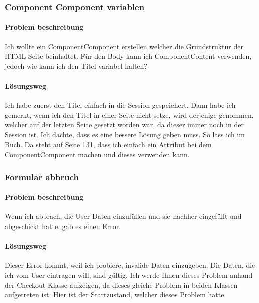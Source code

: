 \documentclass[a4paper, 11pt]{article}
\begin{document}
\subsubsection{Component Component variablen}

\paragraph{Problem beschreibung}

Ich wollte ein ComponentComponent erstellen welcher die Grundstruktur der HTML Seite beinhaltet.
Für den Body kann ich ComponentContent verwenden, jedoch wie kann ich den Titel variabel halten?

\paragraph{Lösungsweg}

Ich habe zuerst den Titel einfach in die Session gespeichert.
Dann habe ich gemerkt, wenn ich den Titel in einer Seite nicht setze, wird derjenige genommen, welcher auf der letzten Seite gesetzt worden war, da dieser immer noch in der Session ist.
Ich dachte, dass es eine bessere Lösung geben muss. So lass ich im Buch\cite{Learning_the_Wonders}.
Da steht auf Seite 131, dass ich einfach ein Attribut bei dem ComponentComponent machen und dieses verwenden kann.

\subsubsection{Formular abbruch}

\paragraph{Problem beschreibung}

Wenn ich abbrach, die User Daten einzufüllen und sie nachher eingefüllt und abgeschickt hatte, gab es einen Error.

\paragraph{Lösungsweg}

Dieser Error kommt, weil ich probiere, invalide Daten einzugeben.
Die Daten, die ich vom User eintragen will, sind gültig.
Ich werde Ihnen dieses Problem anhand der Checkout Klasse aufzeigen, da dieses gleiche Problem in beiden Klassen aufgetreten ist.
Hier ist der Startzustand, welcher dieses Problem hatte.
\end{document}
